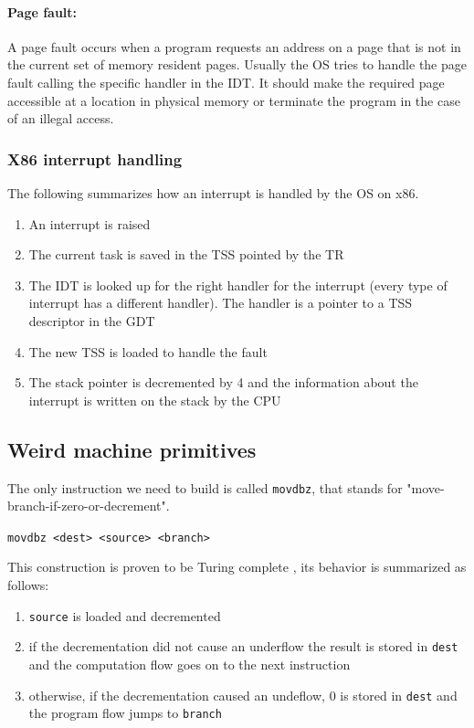 \documentclass[11pt,twoside,a4paper]{article}
\begin{document}
\paragraph{Page fault: } A page fault occurs when a program requests an address on a page that is not in the current set of memory resident pages. Usually the OS tries to handle the page fault calling the specific handler in the IDT. It should make the required page accessible at a location in physical memory or terminate the program in the case of an illegal access.


\subsubsection{X86 interrupt handling}

The following summarizes how an interrupt is handled by the OS on x86.

\begin{enumerate}
\item An interrupt is raised
\item The current task is saved in the TSS pointed by the TR
\item The IDT is looked up for the right handler for the interrupt (every type of interrupt has a different handler). The handler is a pointer to a TSS descriptor in the GDT
\item The new TSS is loaded to handle the fault
\item The stack pointer is decremented by 4 and the information about the interrupt is written on the stack by the CPU
\end{enumerate}

\subsection{Weird machine primitives}

The only instruction we need to build is called \texttt{movdbz}, that stands for "move-branch-if-zero-or-decrement".

\texttt{movdbz <dest> <source> <branch>}

This construction is proven to be Turing complete \cite{mmu_machine}, its behavior is summarized as follows:
\begin{enumerate}
\item \texttt{source} is loaded and decremented
\item if the decrementation did not cause an underflow the result is stored in \texttt{dest} and the computation flow goes on to the next instruction
\item otherwise, if the decrementation caused an undeflow, 0 is stored in \texttt{dest} and the program flow jumps to \texttt{branch}
\end{enumerate}
\end{document}
